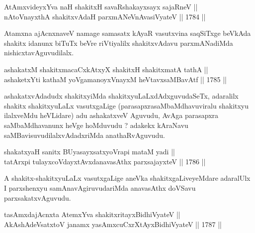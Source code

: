 

\begin{shl}
AtAmxvideyxYva naH shakitxH savaRshakayxsayx sajaRneV || \\
nAtoV\s nayxthA shakitxvAdaH parxmANeVnAvasiVyateV \hfill || 1784 ||  
\end{shl}

\begin{artha}
Atamxna ajAcnxnaveV namage samasatx kAyaR vasutxvina saqSiTxge beVkAda
shakitx idanunx biTuTx beVre riVtiyalilx shakitxvAdavu parxmANadiMda
nishicxtavAguvudilalx.
\end{artha}


\begin{shl}
ashakatxM shakitxmacaCxkAtxyX shakitxH shakitxmatA tathA || \\
ashaketxYti kathaM yoVgamanoyxVnayxM heVtavxsaMBavAtf \hfill || 1785 ||  
\end{shl}

\begin{artha}
ashakatxvAdadudx shakitxyiMda shakitxyuLaLxdAdxguvudaSeTx, adaralilx
shakitx shakitxyuLaLx vasutxgaLige (parasapxrasaMbaMdhavuviralu
shakitxyu ilalxveMdu heVLidare) adu ashakatxveV Aguvudu, AvAga
parasapxra saMbaMdhavanunx heVge hoMduvudu ? adakekx kAraNavu
saMBavisuvudilalxvAdadxriMda anathaRvAguvudu.
\end{artha}


\begin{shl}
shakatxyaH sanitx BUyasayxsatxyoVrapi mataM yadi || \\
tatArxpi tulayxcoVdayxtAvxdanavasAthx parxsajayxteV \hfill || 1786 || 
\end{shl}

\begin{artha}
A shakitx-shakitxyuLaLx vasutxgaLige aneVka shakitxgaLiveyeMdare
adaralUlx I parxshenxyu samAnavAgiruvudariMda anavasAthx doVSavu
parxsakatxvAguvudu.
\end{artha}


\begin{shl}
tasAmxdajAcnxta AtemxYva shakitxritayxBidhiVyateV || \\
AkAshAdeVsatxtoV janamx yasAmxcuCxrXtAyx\s BidhiVyateV \hfill || 1787 ||  
\end{shl}

